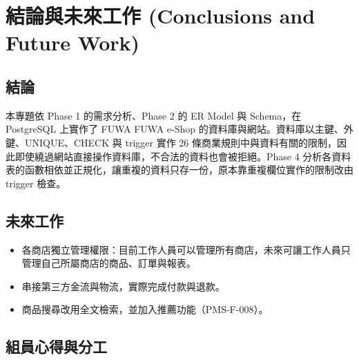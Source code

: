 

\clearpage
\section{結論與未來工作 (Conclusions and Future Work)}

\subsection{結論}

本專題依 Phase 1 的需求分析、Phase 2 的 ER Model 與 Schema，在 PostgreSQL 上實作了 FUWA FUWA e-Shop 的資料庫與網站。資料庫以主鍵、外鍵、UNIQUE、CHECK 與 trigger 實作 26 條商業規則中與資料有關的限制，因此即使繞過網站直接操作資料庫，不合法的資料也會被拒絕。Phase 4 分析各資料表的函數相依並正規化，讓重複的資料只存一份，原本靠重複欄位實作的限制改由 trigger 檢查。

\subsection{未來工作}

\begin{itemize}[itemsep=0.2em]
  \item 各商店獨立管理權限：目前工作人員可以管理所有商店，未來可讓工作人員只管理自己所屬商店的商品、訂單與報表。
  \item 串接第三方金流與物流，實際完成付款與退款。
  \item 商品搜尋改用全文檢索，並加入推薦功能（PMS-F-008）。
\end{itemize}

\subsection{組員心得與分工}

